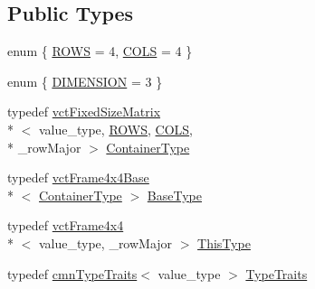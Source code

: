 \subsection*{Public Types}
\begin{DoxyCompactItemize}
\item 
enum \{ \hyperlink{classvct_frame4x4_ab47fb26bf5a63b1dd8dc3257181103eda76a3fe8d4faebc4fd854e2a2768f7dae}{R\-O\-W\-S} = 4, 
\hyperlink{classvct_frame4x4_ab47fb26bf5a63b1dd8dc3257181103eda7c50eb46d3929353c661aa63859a5b45}{C\-O\-L\-S} = 4
 \}
\item 
enum \{ \hyperlink{classvct_frame4x4_a5e333262820027530265ceadfd397d78aebaa2cdbcc1aa6476cec2fc21749c2cf}{D\-I\-M\-E\-N\-S\-I\-O\-N} = 3
 \}
\item 
typedef \hyperlink{classvct_fixed_size_matrix}{vct\-Fixed\-Size\-Matrix}\\*
$<$ value\-\_\-type, \hyperlink{classvct_frame4x4_ab47fb26bf5a63b1dd8dc3257181103eda76a3fe8d4faebc4fd854e2a2768f7dae}{R\-O\-W\-S}, \hyperlink{classvct_frame4x4_ab47fb26bf5a63b1dd8dc3257181103eda7c50eb46d3929353c661aa63859a5b45}{C\-O\-L\-S}, \\*
\-\_\-row\-Major $>$ \hyperlink{classvct_frame4x4_a3174a2ddafc9ae2b74009bab0c2b47c4}{Container\-Type}
\item 
typedef \hyperlink{classvct_frame4x4_base}{vct\-Frame4x4\-Base}\\*
$<$ \hyperlink{classvct_frame4x4_a3174a2ddafc9ae2b74009bab0c2b47c4}{Container\-Type} $>$ \hyperlink{classvct_frame4x4_aea04715fa9c35ad348f07f24250674a9}{Base\-Type}
\item 
typedef \hyperlink{classvct_frame4x4}{vct\-Frame4x4}\\*
$<$ value\-\_\-type, \-\_\-row\-Major $>$ \hyperlink{classvct_frame4x4_ad33a26b915cb65236c0744e2e9937d84}{This\-Type}
\item 
typedef \hyperlink{classcmn_type_traits}{cmn\-Type\-Traits}$<$ value\-\_\-type $>$ \hyperlink{classvct_frame4x4_af8bf02c629bad73636da990ce9106fcf}{Type\-Traits}
\end{DoxyCompactItemize}
